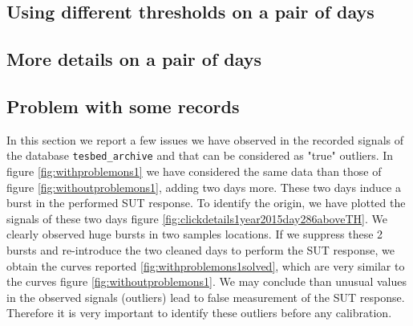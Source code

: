  \newpage\clearpage
\subsection{Using different thresholds on a pair of days}


\newpage\clearpage
\subsection{More details on a pair of days}




\newpage\clearpage
\subsection{Problem with some records}
\label{ss:problems}
In this section we report a few issues we have observed in the recorded signals of the database {\tt tesbed\_archive} and that can be considered as "true" outliers.
In figure \ref{fig:withproblemons1} we have considered the same data than those of figure \ref{fig:withoutproblemons1}, adding two days more. These two days induce a burst in the performed SUT response. To identify the origin, we have plotted the signals of these two days figure \ref{fig:clickdetails1year2015day286aboveTH}. We clearly observed huge bursts in two samples locations. If we suppress these 2 bursts and re-introduce the two cleaned days to perform the SUT response, we obtain the curves reported \ref{fig:withproblemons1solved}, which are very similar to the curves figure \ref{fig:withoutproblemons1}. We may conclude than unusual values in the observed signals (outliers) lead to false measurement of the SUT response. Therefore it is very important to identify these outliers before any calibration.





